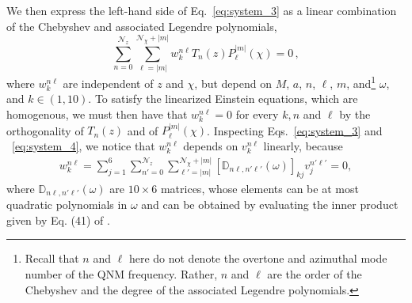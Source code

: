 \documentclass[aps,prx,amsmath,floats,floatfix,twocolumn,
  superscriptaddress,nofootinbib,showpacs]{revtex4-1}
\begin{document}
We then express the left-hand side of Eq.~\eqref{eq:system_3} as a linear combination of the Chebyshev and associated Legendre polynomials, 
\begin{equation}\label{eq:elliptic_eqn_v2}
\sum_{n=0}^{\mathcal{N}_z} \sum_{\ell=|m|}^{\mathcal{N}_{\chi}+|m|} w_k^{n \ell} T_{n}(z) P^{|m|}_{\ell}(\chi) = 0\,, 
\end{equation}
where $w_k^{n \ell}$ are independent of $z$ and $\chi$, but depend on $M$, $a$, $n$, $\ell$, $m$, and\footnote{Recall that $n$ and $\ell$ here do not denote the overtone and azimuthal mode number of the QNM frequency. Rather, $n$ and $\ell$ are the order of the Chebyshev and the degree of the associated Legendre polynomials.} $\omega$, and $k \in (1,10)$. 
To satisfy the linearized Einstein equations, which are homogenous, we must then have that $ w_k^{n \ell} = 0 $ for every $k, n$ and $\ell$ by the orthogonality of $T_{n}(z)$ and of $P^{|m|}_{\ell}(\chi)$.
Inspecting Eqs.~\eqref{eq:system_3} and ~\eqref{eq:system_4}, we notice that $w_k^{n \ell}$ depends on $v_k^{n \ell}$ linearly, because
\begin{equation}
\label{eq:pertFE-2}
\begin{split}
w_k^{n \ell} = \sum_{j=1}^{6} \sum_{n'=0}^{\mathcal{N}_z} \sum_{\ell'=|m|}^{\mathcal{N}_{\chi}+|m|} \left[ \mathbb{D}_{n \ell, n' \ell'}(\omega) \right]_{kj} v_j^{n' \ell'} = 0, 
\end{split}
\end{equation}
where $\mathbb{D}_{n \ell, n' \ell'}(\omega)$ are $10 \times 6$ matrices, whose elements can be at most quadratic polynomials in $\omega$ and can be obtained by evaluating the inner product given by Eq. (41) of \cite{Chung:2023zdq}.  
\end{document}
